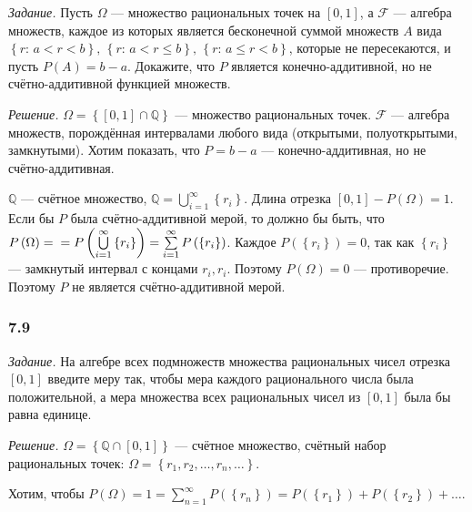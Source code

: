 \textit{Задание.} Пусть $ \Omega $ --- множество рациональных точек на $ \left[ 0, 1 \right] $, а $ \mathcal{F} $ ---
алгебра множеств,
каждое из которых является бесконечной суммой множеств $A$ вида
$ \left\{ r: \, a < r < b \right\}, \,
\left\{ r: \, a < r \leq b \right\}, \,
\left\{ r: \, a \leq r < b \right\} $,
которые не пересекаются, и пусть $P \left( A \right) = b - a$.
Докажите, что $P$ является конечно-аддитивной, но не счётно-аддитивной функцией множеств.

\textit{Решение.} $ \Omega = \left\{ \left[ 0, 1 \right] \cap \mathbb{Q} \right\} $ --- множество рациональных точек.
$ \mathcal{F} $ --- алгебра множеств, порождённая интервалами любого вида (открытыми, полуоткрытыми, замкнутыми).
Хотим показать, что $P = b - a$ --- конечно-аддитивная, но не счётно-аддитивная.

$ \mathbb{Q} $ --- счётное множество, $ \mathbb{Q} = \bigcup \limits_{i=1}^{ \infty } \left\{ r_i \right\} $.
Длина отрезка $ \left[ 0, 1 \right] - P \left( \Omega \right) = 1$.
Если бы $P$ была счётно-аддитивной мерой, то должно бы быть,
что
$P \left( \Omega \right) = \\
= P \left( \bigcup \limits_{i=1}^{ \infty } \left\{ r_i \right\} \right) =
\sum \limits_{i=1}^{ \infty } P \left( \left\{ r_i \right\} \right) $.
Каждое $P \left( \left\{ r_i \right\} \right) = 0$, так как $ \left\{ r_i \right\} $ --- замкнутый интервал с концами $r_i, r_i$.
Поэтому $P \left( \Omega \right) = 0$ --- противоречие.
Поэтому $P$ не является счётно-аддитивной мерой.

\subsubsection*{7.9}

\textit{Задание.}
На алгебре всех подмножеств множества рациональных чисел отрезка $ \left[ 0, 1 \right] $ введите меру так,
чтобы мера каждого рационального числа была положительной, а мера множества всех рациональных чисел из $ \left[ 0, 1 \right] $ была бы равна единице.

\textit{Решение.}
$ \Omega = \left\{ \mathbb{Q} \cap \left[ 0, 1 \right] \right\} $ --- счётное множество, счётный набор рациональных точек:
$ \Omega =
\left\{ r_1, r_2, \dotsc, r_n, \dotsc \right\} $.

Хотим,
чтобы
$P \left( \Omega \right) =
1 =
\sum \limits_{n=1}^{ \infty } P \left( \left\{ r_n \right\} \right) =
P \left( \left\{ r_1 \right\} \right) + P \left( \left\{ r_2 \right\} \right) + \dotsc $.

